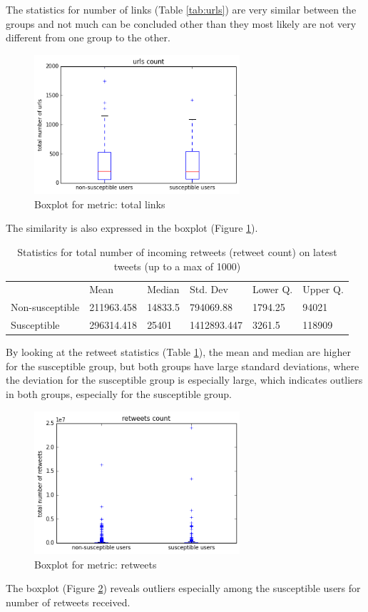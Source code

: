 \documentclass[10pt]{IEEEtran}
\begin{document}
The statistics for number of links (Table \ref{tab:urls}) are very similar between the groups and not much can be concluded other than they most likely are not very different from one group to the other.
\begin{figure}[H]
  \centering
  \includegraphics[width=3.0in]{total_urls_boxplot}
  \caption{Boxplot for metric: total links}
  \label{fig:total_urls_boxplot}
\end{figure}
The similarity is also expressed in the boxplot (Figure \ref{fig:total_urls_boxplot}).
\begin{table}[H]

\begin{tabular}{llllll}
\textbf{}       & Mean       & Median  & Std. Dev    & Lower Q. & Upper Q. \\
Non-susceptible & 211963.458 & 14833.5 & 794069.88   & 1794.25    & 94021  \\
Susceptible     & 296314.418 & 25401   & 1412893.447 & 3261.5   &  118909 
\end{tabular}
\caption{Statistics for total number of incoming retweets (retweet count) on latest tweets (up to a max of 1000)}
\label{tab:retweets}
\end{table}
By looking at the retweet statistics (Table \ref{tab:retweets}), the mean and median are higher for the susceptible group, but both groups have large standard deviations, where the deviation for the susceptible group is especially large, which indicates outliers in both groups, especially for the susceptible group.
\begin{figure}[H]
  \centering
  \includegraphics[width=3.0in]{retweets_boxplot}
  \caption{Boxplot for metric: retweets}
  \label{fig:retweets_boxplot}
\end{figure}
The boxplot (Figure \ref{fig:retweets_boxplot}) reveals outliers especially among the susceptible users for number of retweets received.
\\\\
\end{document}
